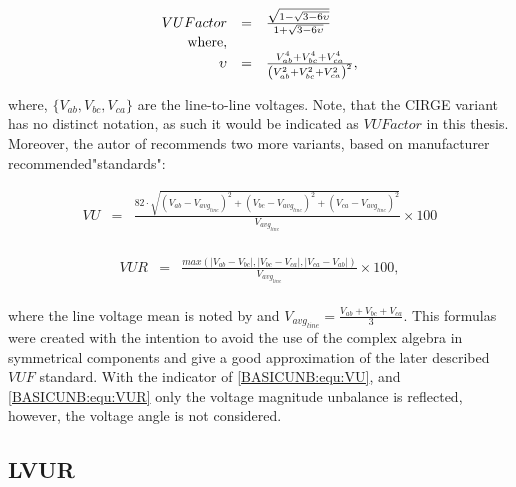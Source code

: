 	\begin{equation}
        \begin{array}{rcl}
            VUFactor&=&\frac{\sqrt{{1-\sqrt{3-6\upsilon}}}}{1+\sqrt{3-6\upsilon}}\\
						\textnormal{where},&&\\
						\upsilon&=&\frac{V_{ab}^4+V_{bc}^4+V_{ca}^4}{\left(V_{ab}^2+V_{bc}^2+V_{ca}^2\right)^2},					
        \end{array}
        \label{BASICUNB:equ:CIRGE}
    \end{equation}
		
		where, $\{V_{ab},V_{bc},V_{ca}\}$ are the line-to-line voltages. Note, that the CIRGE variant has no distinct notation, as such it would be indicated as $VUFactor$ in this thesis. Moreover, the autor of \cite{robert1992assessing} recommends two more variants, based on manufacturer recommended"standards": 
		
		\begin{equation}
        \begin{array}{rcl}
            VU&=&\frac{82\cdot\sqrt{(V_{ab}-V_{avg_{line}})^2+(V_{bc}-V_{avg_{line}})^2+(V_{ca}-V_{avg_{line}})^2}}{V_{avg_{line}}}\times100\\					
        \end{array}
        \label{BASICUNB:equ:VU}
    \end{equation}
		
		\begin{equation}
        \begin{array}{rcl}
            VUR&=&\frac{max\left( |V_{ab}-V_{bc}|,|V_{bc}-V_{ca}|,|V_{ca}-V_{ab}| \right)}{V_{avg_{line}}}\times100,\\				
        \end{array}
        \label{BASICUNB:equ:VUR}
    \end{equation}
		
		where the line voltage mean is noted by and $V_{avg_{line}}=\frac{V_{ab}+V_{bc}+V_{ca}}{3}$.
		This formulas were created with the intention to avoid the use of the complex algebra in symmetrical components and give
a good approximation of the later described $VUF$ standard. With the indicator of \ref{BASICUNB:equ:VU}, and \ref{BASICUNB:equ:VUR} only the voltage magnitude unbalance is reflected, however, the voltage angle is not considered. 

	
	\subsection{LVUR}
	

